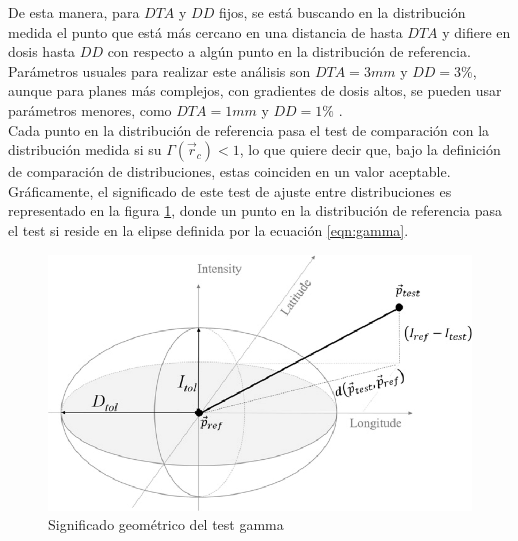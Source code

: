 De esta manera, para $DTA$ y $DD$ fijos, se está buscando en la distribución medida el punto que está más cercano en una distancia de hasta $DTA$ y difiere en dosis hasta $DD$ con respecto a algún punto en la distribución de referencia. Parámetros usuales para realizar este análisis son $DTA=3 mm$ y $DD=3\%$, aunque para planes más complejos, con gradientes de dosis altos, se pueden usar parámetros menores, como $DTA=1 mm$ y $DD=1\%$ \cite{Li2011}.\\

Cada punto en la distribución de referencia pasa el test de comparación con la distribución medida si su $\Gamma(\vec{r}_c)<1$, lo que quiere decir que, bajo la definición de comparación de distribuciones, estas coinciden en un valor aceptable. Gráficamente, el significado de este test de ajuste entre distribuciones es representado en la figura \ref{fig:elipseGamma}, donde un punto en la distribución de referencia pasa el test si reside en la elipse  definida por la ecuación \eqref{eqn:gamma}.\\
\begin{figure}[H]
	\centering
	\includegraphics[width=0.5\linewidth]{images/gammaEllipse.png}
	\caption{Significado geométrico del test gamma }
	\label{fig:elipseGamma}
\end{figure}





